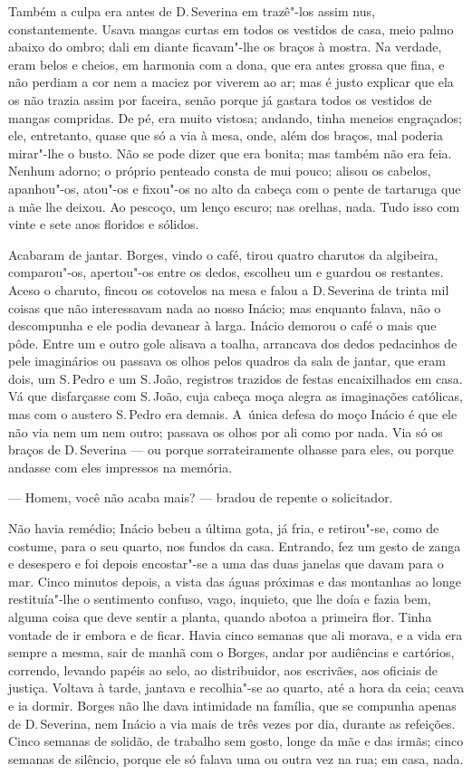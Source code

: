 \begin{linenumbers}
Também a culpa era antes de D.\,Severina em trazê"-los assim nus,
constantemente. Usava mangas curtas em todos os vestidos de casa, meio
palmo abaixo do ombro; dali em diante ficavam"-lhe os braços à mostra. Na
verdade, eram belos e cheios, em harmonia com a dona, que era antes
grossa que fina, e não perdiam a cor nem a maciez por viverem ao ar; mas
é justo explicar que ela os não trazia assim por faceira, senão porque
já gastara todos os vestidos de mangas compridas. De pé, era muito
vistosa; andando, tinha meneios engraçados; ele, entretanto, quase que
só a via à mesa, onde, além dos braços, mal poderia mirar"-lhe o busto.
Não se pode dizer que era bonita; mas também não era feia. Nenhum
adorno; o próprio penteado consta de mui pouco; alisou os cabelos,
apanhou"-os, atou"-os e fixou"-os no alto da cabeça com o pente de
tartaruga que a mãe lhe deixou. Ao pescoço, um lenço escuro; nas
orelhas, nada. Tudo isso com vinte e sete anos floridos e sólidos.

Acabaram de jantar. Borges, vindo o café, tirou quatro charutos da
algibeira, comparou"-os, apertou"-os entre os dedos, escolheu um e guardou
os restantes. Aceso o charuto, fincou os cotovelos na mesa e falou a D.\,Severina de trinta mil coisas que não interessavam nada ao nosso Inácio;
mas enquanto falava, não o descompunha e ele podia devanear à larga.
Inácio demorou o café o mais que pôde. Entre um e outro gole alisava a
toalha, arrancava dos dedos pedacinhos de pele imaginários ou passava os
olhos pelos quadros da sala de jantar, que eram dois, um S.\,Pedro e um
S.\,João, registros trazidos de festas encaixilhados em casa. Vá que
disfarçasse com S.\,João, cuja cabeça moça alegra as imaginações
católicas, mas com o austero S.\,Pedro era demais. A~única defesa do moço
Inácio é que ele não via nem um nem outro; passava os olhos por ali como
por nada. Via só os braços de D.\,Severina --- ou porque sorrateiramente
olhasse para eles, ou porque andasse com eles impressos na memória.

--- Homem, você não acaba mais? --- bradou de repente o solicitador.

Não havia remédio; Inácio bebeu a última gota, já fria, e retirou"-se,
como de costume, para o seu quarto, nos fundos da casa. Entrando, fez um
gesto de zanga e desespero e foi depois encostar"-se a uma das duas
janelas que davam para o mar. Cinco minutos depois, a vista das águas
próximas e das montanhas ao longe restituía"-lhe o sentimento confuso,
vago, inquieto, que lhe doía e fazia bem, alguma coisa que deve sentir a
planta, quando abotoa a primeira flor. Tinha vontade de ir embora e de
ficar. Havia cinco semanas que ali morava, e a vida era sempre a mesma,
sair de manhã com o Borges, andar por audiências e cartórios, correndo,
levando papéis ao selo, ao distribuidor, aos escrivães, aos oficiais de
justiça. Voltava à tarde, jantava e recolhia"-se ao quarto, até a hora da
ceia; ceava e ia dormir. Borges não lhe dava intimidade na família, que
se compunha apenas de D.\,Severina, nem Inácio a via mais de três vezes
por dia, durante as refeições. Cinco semanas de solidão, de trabalho sem
gosto, longe da mãe e das irmãs; cinco semanas de silêncio, porque ele
só falava uma ou outra vez na rua; em casa, nada.


\end{linenumbers}
